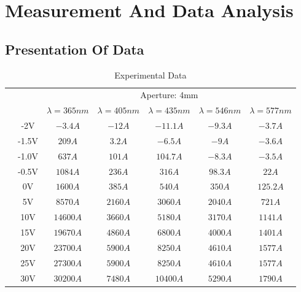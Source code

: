 \section{Measurement And Data Analysis}

	\subsection{Presentation Of Data}
		\begin{table}[htbp]
			\centering
			\begin{tabular}{|c|c|c|c|c|c|c|}
				\hline
				\multicolumn{2}{|c|}{} &\multicolumn{5}{|c|}{Aperture: 4mm} \\
				\cline{3-7}
				\multicolumn{2}{|c|}{}  & $\lambda = 365nm$ & $\lambda = 405nm$ & $\lambda = 435nm$ & $\lambda = 546nm$ & $\lambda = 577nm$\\\hline
				
				\multirow{10}{*}{\rotatebox{90}{Data}}  & -2V & \(-3.4A\) &  \(-12A \)&  \(-11.1A\) &  \(-9.3A\) &  \(-3.7A\) \\\cline{2-7}    
				&-1.5V & \(209A\) &  \(3.2A\) &  \(-6.5A\) &  \(-9A\) &  \(-3.6A\) \\\cline{2-7}
				&-1.0V & \(637A\) &  \(101A\) &  \(104.7A\) &  \(-8.3A\) &  \(-3.5A\) \\\cline{2-7}
				& -0.5V & \(1084A\) &  \(236A\) &  \(316A\) &  \(98.3A\) &  \(22A\) \\\cline{2-7}
				& 0V & \(1600A\)&   \(385A\)&   \(540A\)    & \(350A\) &    \(125.2A\) \\ \cline{2-7}
				& 5V& \(8570A\) & \(2160A\)& \(3060A\)&   \(2040A\)&   \(721A\)\\\cline{2-7}
				& 10V& \(14600A\) & \(3660A\)& \(5180A\)&   \(3170A\)&   \(1141A\)\\
				\cline{2-7}
				& 15V& \(19670A\) & \(4860A\)& \(6800A\)&   \(4000A\)&   \(1401A\)\\\cline{2-7}
				& 20V& \(23700A\) & \(5900A\)& \(8250A\)&   \(4610A\)&   \(1577A\)\\\cline{2-7}
				& 25V& \(27300A\) & \(5900A\)& \(8250A\)&   \(4610A\)&   \(1577A\)\\\cline{2-7}
				& 30V& \(30200A\) & \(7480A\)& \(10400A\)&   \(5290A\)&   \(1790A\)\\
				\hline  
				
			\end{tabular}
			\caption{Experimental Data}
			\label{tbl:data}
		\end{table}
	
